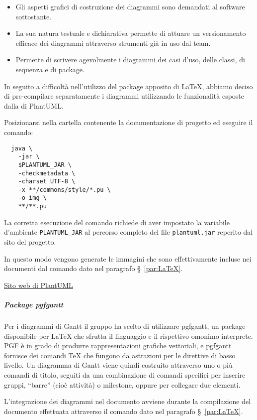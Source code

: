 \documentclass[../../norme-di-progetto.tex]{subfiles}
\begin{document}
\begin{itemize}
  \item Gli aspetti grafici di costruzione dei diagrammi sono demandati al software sottostante.
  \item La sua natura testuale e dichiarativa permette di attuare un versionamento efficace dei diagrammi attraverso strumenti già in uso dal team.
  \item Permette di scrivere agevolmente i diagrammi dei casi d'uso, delle classi, di sequenza e di package.
\end{itemize}

In seguito a difficoltà nell'utilizzo del package apposito di \LaTeX{}, abbiamo deciso di pre-compilare separatamente i diagrammi utilizzando le funzionalità esposte dalla  di PlantUML\@.

Posizionarsi nella cartella contenente la documentazione di progetto ed eseguire il comando:

\begin{verbatim}
  java \
    -jar \
    $PLANTUML_JAR \
    -checkmetadata \
    -charset UTF-8 \
    -x **/commons/style/*.pu \
    -o img \
    **/**.pu
\end{verbatim}

La corretta esecuzione del comando richiede di aver impostato la variabile d'ambiente \verb|PLANTUML_JAR| al percorso completo del file \verb|plantuml.jar| reperito dal sito del progetto.

In questo modo vengono generate le immagini che sono effettivamente incluse nei documenti dal comando dato nel paragrafo §~\ref{par:LaTeX}.

\href{https://plantuml.com/}{Sito web di PlantUML}

\subparagraph{Package pgfgantt}%
\label{subp:pgfgantt}

Per i diagrammi di Gantt il gruppo ha scelto di utilizzare pgfgantt, un package disponibile per \LaTeX{} che sfrutta il linguaggio  e il rispettivo omonimo interprete.
PGF è in grado di produrre rappresentazioni grafiche vettoriali, e pgfgantt fornisce dei comandi \TeX{} che fungono da astrazioni per le direttive di basso livello.
Un diagramma di Gantt viene quindi costruito attraverso uno o più comandi di titolo, seguiti da una combinazione di comandi specifici per inserire gruppi, ``barre'' (cioè attività) o milestone, oppure per collegare due elementi.

L'integrazione dei diagrammi nel documento avviene durante la compilazione del documento effettuata attraverso il comando dato nel paragrafo §~\ref{par:LaTeX}.
\end{document}
